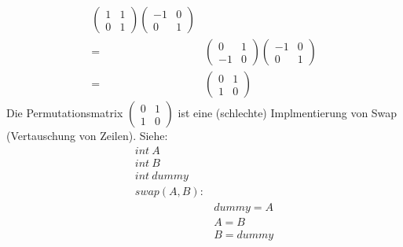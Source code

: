 \documentclass[9pt]{article} %
\begin{document}
\begin{bsp}
{\begin{align*}
\begin{pmatrix}
        1 & 1\\
        0 & 1
        \end{pmatrix}
        \begin{pmatrix}
        -1 & 0\\
        0 & 1
        \end{pmatrix}\\ %
        = & 
        \begin{pmatrix}
        0 & 1\\
        -1 & 0
        \end{pmatrix}
        \begin{pmatrix}
        -1 & 0\\
        0 & 1
        \end{pmatrix} \\ %
        = & 
        \begin{pmatrix}
        0 & 1\\
        1 & 0
        \end{pmatrix}
\end{align*}}
\noindent Die Permutationsmatrix $\begin{pmatrix}
        0 & 1\\
        1 & 0
        \end{pmatrix}$  ist eine (schlechte) Implmentierung von Swap (Vertauschung von Zeilen). 
Siehe: 
\begin{align*}
    int\ A \\
    int\ B \\
    int\  dummy \\
    swap(A,B): &  \\
     & dummy = A \\
    & A = B\\
    &  B = dummy
\end{align*}
        \begin{table}[H]

\end{table}
\end{bsp}
\end{document}
